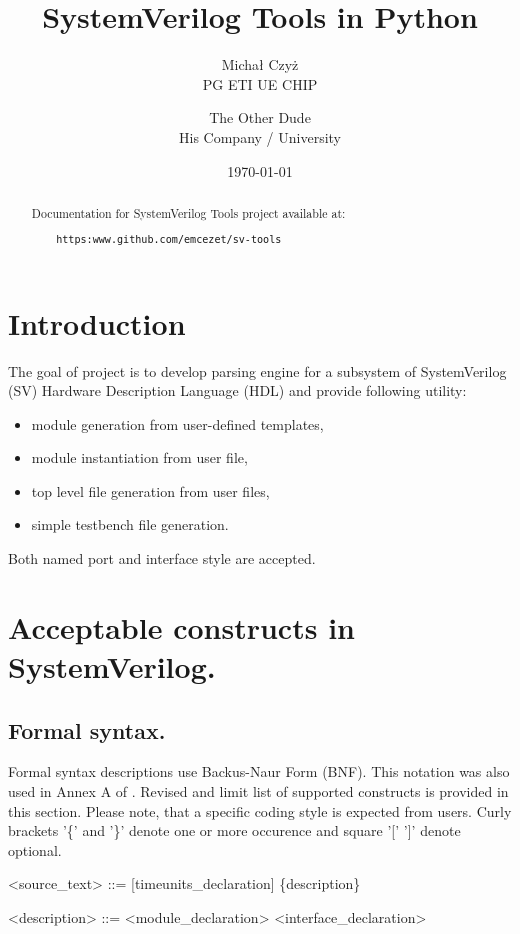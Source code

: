 \documentclass{article}
\title{SystemVerilog Tools in Python}
\author{Michał Czyż  \\
    PG ETI UE CHIP \\
    \and 
    The Other Dude \\
    His Company / University \\
    }
\date{\today}
\begin{document}
\maketitle
\tableofcontents
\newpage

\begin{abstract}
Documentation for SystemVerilog Tools project available at:
\begin{verbatim}
    https:www.github.com/emcezet/sv-tools
\end{verbatim}

\end{abstract}

\section{Introduction}
{ The goal of project is to develop parsing engine for a subsystem of SystemVerilog (SV)
Hardware Description Language (HDL) and provide following utility:
\begin{itemize}
    \item module generation from user-defined templates,
    \item module instantiation from user file,
    \item top level file generation from user files,
    \item simple testbench file generation.
\end{itemize}
Both named port and interface style are accepted. }

\section{Acceptable constructs in SystemVerilog.}

\subsection{Formal syntax.}
{ Formal syntax descriptions use Backus-Naur Form (BNF). This notation was also used in Annex A of \cite{standard}.
Revised and limit list of supported constructs is provided in this section. Please note, that a specific coding
style is expected from users. Curly brackets '\{' and '\}' denote one or more occurence and square '[' ']' denote optional.}

\begin{grammar}
<source_text> ::= [timeunits_declaration] \{description\}
\end{grammar}
\begin{grammar}
<description> ::= <module_declaration>
                  \alt <interface_declaration>
\end{grammar}
\end{document}
